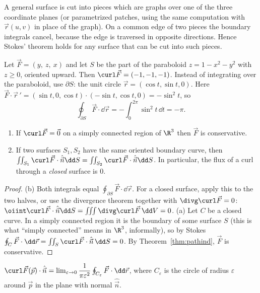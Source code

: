 A general surface is cut into pieces which are graphs over one of the three coordinate planes (or parametrized patches, using the same computation with $\vec r(u,v)$ in place of the graph). On a common edge of two pieces the boundary integrals cancel, because the edge is traversed in opposite directions. Hence Stokes' theorem holds for any surface that can be cut into such pieces.

\begin{example}
Let $\vec F=(y,\ z,\ x)$ and let $S$ be the part of the paraboloid $z=1-x^2-y^2$ with $z\ge0$, oriented upward. Then $\curl\vec F=(-1,-1,-1)$. Instead of integrating over the paraboloid, use $\partial S$: the unit circle $\vec r=(\cos t,\sin t,0)$. Here $\vec F\cdot\vec r\,'=(\sin t,0,\cos t)\cdot(-\sin t,\cos t,0)=-\sin^2t$, so
\[
\oint_{\partial S}\vec F\cdot\dd\vec r=-\int_0^{2\pi}\sin^2t\,\dd t=-\pi .
\]
\end{example}

\begin{theorem}[Consequences]\label{thm:consequences}
\begin{enumerate}[label=(\alph*)]
  \item If $\curl\vec F=\vec0$ on a simply connected region of $\R^3$ then $\vec F$ is conservative.
  \item If two surfaces $S_1,S_2$ have the same oriented boundary curve, then $\iint_{S_1}\curl\vec F\cdot\hat{\vec n}\dd S=\iint_{S_2}\curl\vec F\cdot\hat{\vec n}\dd S$. In particular, the flux of a curl through a \emph{closed} surface is $0$.
\end{enumerate}
\end{theorem}

\begin{proof}
(b) Both integrals equal $\oint_{\partial S}\vec F\cdot\dd\vec r$. For a closed surface, apply this to the two halves, or use the divergence theorem together with $\divg\curl\vec F=0$: $\oiint\curl\vec F\cdot\hat{\vec n}\dd S=\iiint\divg\curl\vec F\,\dd V=0$. (a) Let $C$ be a closed curve. In a simply connected region it is the boundary of some surface $S$ (this is what ``simply connected'' means in $\R^3$, informally), so by Stokes $\oint_C\vec F\cdot\dd\vec r=\iint_S\curl\vec F\cdot\hat{\vec n}\,\dd S=0$. By Theorem~\ref{thm:pathind}, $\vec F$ is conservative.
\end{proof}

\begin{theorem}
$\curl\vec F(\vec p)\cdot\hat{\vec n}=\lim_{\varepsilon\to0}\dfrac1{\pi\varepsilon^2}\oint_{C_\varepsilon}\vec F\cdot\dd\vec r$, where $C_\varepsilon$ is the circle of radius $\varepsilon$ around $\vec p$ in the plane with normal $\hat{\vec n}$.
\end{theorem}

